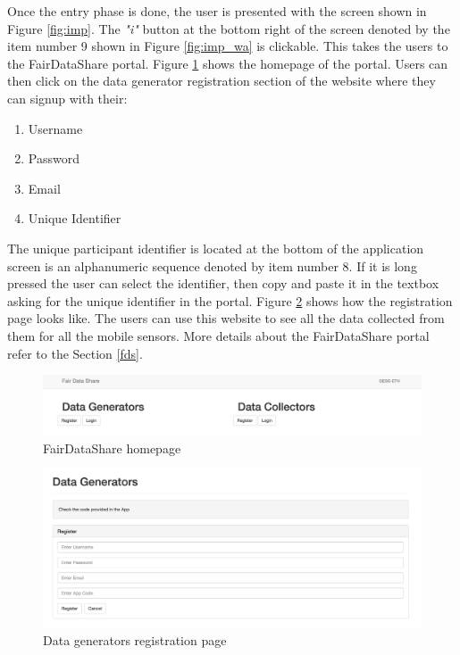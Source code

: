 Once the entry phase is done, the user is presented with the screen shown in Figure \ref{fig:imp}.
The {\it "i"} button at the bottom right of the screen denoted by the item number 9 shown in Figure \ref{fig:imp_wa} is clickable. This takes the users to the FairDataShare portal. Figure \ref{fig:fds_home} shows the homepage of the portal. Users can then click on the data generator registration section of the website where they can signup with their:

\begin{enumerate}
    \item Username
    \item Password
    \item Email
    \item Unique Identifier
\end{enumerate}

The unique participant identifier is located at the bottom of the application screen is an alphanumeric sequence denoted by item number 8. If it is long pressed the user can select the identifier, then copy and paste it in the textbox asking for the unique identifier in the portal. Figure \ref{fig:first} shows how the registration page looks like.
The users can use this website to see all the data collected from them for all the mobile sensors. More details about the FairDataShare portal
refer to the Section \ref{fds}.
%

\begin{figure}[ht!]
\centering
\includegraphics[width=\textwidth,keepaspectratio]{./images/fds1}
\caption{FairDataShare homepage}
\label{fig:fds_home}
\end{figure}

\begin{figure}[ht!]
\centering
\includegraphics[width=\textwidth,keepaspectratio]{./images/fds_user_register1}
\caption{Data generators registration page}
\label{fig:first}
\end{figure}

